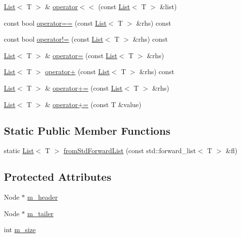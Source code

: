 \begin{DoxyCompactItemize}
\hyperlink{classprism_1_1containers_1_1_list}{List}$<$ T $>$ \& \hyperlink{classprism_1_1containers_1_1_list_a4be36f1e4e06693c7482af37c97b5783}{operator$<$$<$} (const \hyperlink{classprism_1_1containers_1_1_list}{List}$<$ T $>$ \&list)
\item 
const bool \hyperlink{classprism_1_1containers_1_1_list_abe257cf1b17f602763bd0e1a4cc4d23c}{operator==} (const \hyperlink{classprism_1_1containers_1_1_list}{List}$<$ T $>$ \&rhs) const 
\item 
const bool \hyperlink{classprism_1_1containers_1_1_list_a2b348d356754ac82d81fb710e0ffe136}{operator!=} (const \hyperlink{classprism_1_1containers_1_1_list}{List}$<$ T $>$ \&rhs) const 
\item 
\hyperlink{classprism_1_1containers_1_1_list}{List}$<$ T $>$ \& \hyperlink{classprism_1_1containers_1_1_list_ade1b59b663876dff902045eb763e2abc}{operator=} (const \hyperlink{classprism_1_1containers_1_1_list}{List}$<$ T $>$ \&rhs)
\item 
\hyperlink{classprism_1_1containers_1_1_list}{List}$<$ T $>$ \hyperlink{classprism_1_1containers_1_1_list_ac8c6b1c2e0692d567f4cb98be914405f}{operator+} (const \hyperlink{classprism_1_1containers_1_1_list}{List}$<$ T $>$ \&rhs) const 
\item 
\hyperlink{classprism_1_1containers_1_1_list}{List}$<$ T $>$ \& \hyperlink{classprism_1_1containers_1_1_list_a9ac0e1bb4dcd34666b325f8ec63bea96}{operator+=} (const \hyperlink{classprism_1_1containers_1_1_list}{List}$<$ T $>$ \&rhs)
\item 
\hyperlink{classprism_1_1containers_1_1_list}{List}$<$ T $>$ \& \hyperlink{classprism_1_1containers_1_1_list_a032dbc85b98879778aec4e369657e5c5}{operator+=} (const T \&value)
\end{DoxyCompactItemize}
\subsection*{Static Public Member Functions}
\begin{DoxyCompactItemize}
\item 
static \hyperlink{classprism_1_1containers_1_1_list}{List}$<$ T $>$ \hyperlink{classprism_1_1containers_1_1_list_a8b328da11995f5e347a63886e292fc76}{from\+Std\+Forward\+List} (const std\+::forward\+\_\+list$<$ T $>$ \&fl)
\end{DoxyCompactItemize}
\subsection*{Protected Attributes}
\begin{DoxyCompactItemize}
\item 
Node $\ast$ \hyperlink{classprism_1_1containers_1_1_list_ada79cc0aa6f4229e733a1745a183e392}{m\+\_\+header}
\item 
Node $\ast$ \hyperlink{classprism_1_1containers_1_1_list_aab976f075243f4b000e756e1434b59c8}{m\+\_\+tailer}
\item 
int \hyperlink{classprism_1_1containers_1_1_list_a0aa092d322df5228c2eec7863fe22b7e}{m\+\_\+size}
\end{DoxyCompactItemize}


